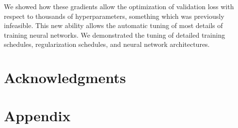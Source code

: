 \documentclass{article}
\begin{document}
We showed how these gradients allow the optimization of validation loss with respect to thousands of hyperparameters, something which was previously infeasible.
This new ability allows the automatic tuning of most details of training neural networks.
We demonstrated the tuning of detailed training schedules, regularization schedules, and neural network architectures.

\section*{Acknowledgments} 





\section*{Appendix}
\end{document}
